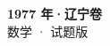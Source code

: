 \documentclass[zihao=-4, a4paper]{ctexart}
\begin{document}
\begin{center}
  {\Large\bfseries 1977 年·辽宁卷}\\[4pt]
  {\large 数学 · 试题版}
\end{center}
\medskip
{}

\end{document}
